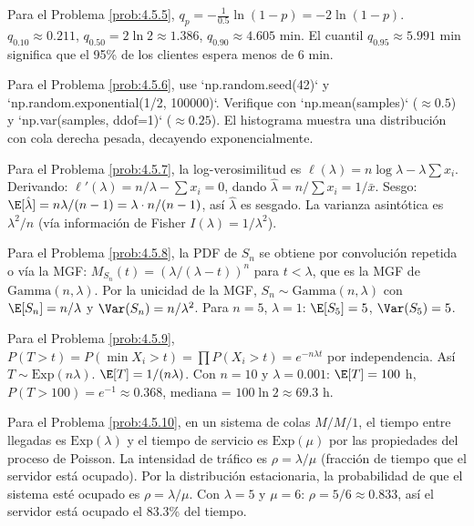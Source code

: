 \begin{sugerencia}
	\label{sug:4.5.5}
	Para el Problema \ref{prob:4.5.5}, $q_{p} = -\frac{1}{0.5}\ln(1-p) = -2\ln(1-p)$. $q_{0.10} \approx 0.211$, $q_{0.50} = 2 \ln 2 \approx 1.386$, $q_{0.90} \approx 4.605$ min. El cuantil $q_{0.95} \approx 5.991$ min significa que el 95\% de los clientes espera menos de 6 min.
\end{sugerencia}

\begin{sugerencia}
	\label{sug:4.5.6}
	Para el Problema \ref{prob:4.5.6}, use `np.random.seed(42)` y `np.random.exponential(1/2, 100000)`. Verifique con `np.mean(samples)` ($\approx 0.5$) y `np.var(samples, ddof=1)` ($\approx 0.25$). El histograma muestra una distribución con cola derecha pesada, decayendo exponencialmente.
\end{sugerencia}

\begin{sugerencia}
	\label{sug:4.5.7}
	Para el Problema \ref{prob:4.5.7}, la log-verosimilitud es $\ell(\lambda) = n\log \lambda - \lambda \sum x_i$. Derivando: $\ell'(\lambda) = n/\lambda - \sum x_i = 0$, dando $\hat{\lambda} = n/\sum x_i = 1/\bar{x}$. Sesgo: $\E[\hat{\lambda}] = n\lambda/(n-1) = \lambda \cdot n/(n-1)$, así $\hat{\lambda}$ es sesgado. La varianza asintótica es $\lambda^{2}/n$ (vía información de Fisher $I(\lambda) = 1/\lambda^{2}$).
\end{sugerencia}

\begin{sugerencia}
	\label{sug:4.5.8}
	Para el Problema \ref{prob:4.5.8}, la PDF de $S_{n}$ se obtiene por convolución repetida o vía la MGF: $M_{S_{n}}(t) = (\lambda/(\lambda - t))^{n}$ para $t < \lambda$, que es la MGF de $\text{Gamma}(n, \lambda)$. Por la unicidad de la MGF, $S_{n} \sim \text{Gamma}(n, \lambda)$ con $\E[S_{n}] = n/\lambda$ y $\Var(S_{n}) = n/\lambda^{2}$. Para $n = 5$, $\lambda = 1$: $\E[S_{5}] = 5$, $\Var(S_{5}) = 5$.
\end{sugerencia}

\begin{sugerencia}
	\label{sug:4.5.9}
	Para el Problema \ref{prob:4.5.9}, $P(T > t) = P(\min X_{i} > t) = \prod P(X_{i} > t) = e^{-n\lambda t}$ por independencia. Así $T \sim \text{Exp}(n\lambda)$. $\E[T] = 1/(n\lambda)$. Con $n = 10$ y $\lambda = 0.001$: $\E[T] = 100$ h, $P(T > 100) = e^{-1} \approx 0.368$, mediana = $100 \ln 2 \approx 69.3$ h.
\end{sugerencia}

\begin{sugerencia}
	\label{sug:4.5.10}
	Para el Problema \ref{prob:4.5.10}, en un sistema de colas $M/M/1$, el tiempo entre llegadas es $\text{Exp}(\lambda)$ y el tiempo de servicio es $\text{Exp}(\mu)$ por las propiedades del proceso de Poisson. La intensidad de tráfico es $\rho = \lambda/\mu$ (fracción de tiempo que el servidor está ocupado). Por la distribución estacionaria, la probabilidad de que el sistema esté ocupado es $\rho = \lambda/\mu$. Con $\lambda = 5$ y $\mu = 6$: $\rho = 5/6 \approx 0.833$, así el servidor está ocupado el 83.3\% del tiempo.
\end{sugerencia}

